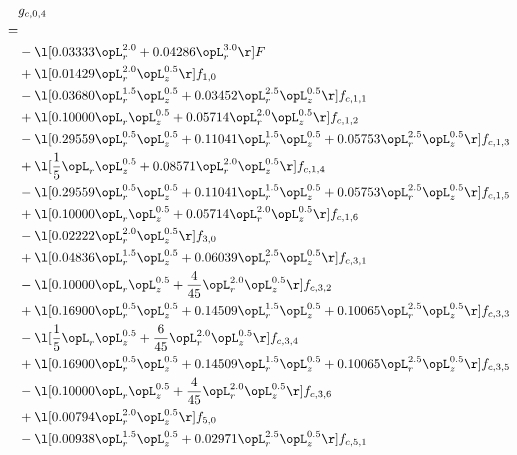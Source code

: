 \begin{alignat}{2} 
\label{eq:g_04_0} 
& g_{c,0,4} \nonumber \\ 
 = \\ 
& - \l[  0.03333 \opL_r^{2.0} +  0.04286 \opL_r^{3.0}  \r] F \nonumber \\ 
& + \l[  0.01429 \opL_r^{2.0} \opL_z^{0.5}  \r] f_{1,0} \nonumber \\ 
& - \l[  0.03680 \opL_r^{1.5} \opL_z^{0.5} +  0.03452 \opL_r^{2.5} \opL_z^{0.5}  \r] f_{c,1,1} \nonumber \\ 
& + \l[  0.10000 \opL_r \opL_z^{0.5} +  0.05714 \opL_r^{2.0} \opL_z^{0.5}  \r] f_{c,1,2} \nonumber \\ 
& - \l[  0.29559 \opL_r^{0.5} \opL_z^{0.5} +  0.11041 \opL_r^{1.5} \opL_z^{0.5} +  0.05753 \opL_r^{2.5} \opL_z^{0.5}  \r] f_{c,1,3} \nonumber \\ 
& + \l[ \frac{1}{5} \opL_r \opL_z^{0.5} +  0.08571 \opL_r^{2.0} \opL_z^{0.5}  \r] f_{c,1,4} \nonumber \\ 
& - \l[  0.29559 \opL_r^{0.5} \opL_z^{0.5} +  0.11041 \opL_r^{1.5} \opL_z^{0.5} +  0.05753 \opL_r^{2.5} \opL_z^{0.5}  \r] f_{c,1,5} \nonumber \\ 
& + \l[  0.10000 \opL_r \opL_z^{0.5} +  0.05714 \opL_r^{2.0} \opL_z^{0.5}  \r] f_{c,1,6} \nonumber \\ 
& - \l[  0.02222 \opL_r^{2.0} \opL_z^{0.5}  \r] f_{3,0} \nonumber \\ 
& + \l[  0.04836 \opL_r^{1.5} \opL_z^{0.5} +  0.06039 \opL_r^{2.5} \opL_z^{0.5}  \r] f_{c,3,1} \nonumber \\ 
& - \l[  0.10000 \opL_r \opL_z^{0.5} + \frac{4}{45} \opL_r^{2.0} \opL_z^{0.5}  \r] f_{c,3,2} \nonumber \\ 
& + \l[  0.16900 \opL_r^{0.5} \opL_z^{0.5} +  0.14509 \opL_r^{1.5} \opL_z^{0.5} +  0.10065 \opL_r^{2.5} \opL_z^{0.5}  \r] f_{c,3,3} \nonumber \\ 
& - \l[ \frac{1}{5} \opL_r \opL_z^{0.5} + \frac{6}{45} \opL_r^{2.0} \opL_z^{0.5}  \r] f_{c,3,4} \nonumber \\ 
& + \l[  0.16900 \opL_r^{0.5} \opL_z^{0.5} +  0.14509 \opL_r^{1.5} \opL_z^{0.5} +  0.10065 \opL_r^{2.5} \opL_z^{0.5}  \r] f_{c,3,5} \nonumber \\ 
& - \l[  0.10000 \opL_r \opL_z^{0.5} + \frac{4}{45} \opL_r^{2.0} \opL_z^{0.5}  \r] f_{c,3,6} \nonumber \\ 
& + \l[  0.00794 \opL_r^{2.0} \opL_z^{0.5}  \r] f_{5,0} \nonumber \\ 
& - \l[  0.00938 \opL_r^{1.5} \opL_z^{0.5} +  0.02971 \opL_r^{2.5} \opL_z^{0.5}  \r] f_{c,5,1} \nonumber \\ 

\end{alignat}
